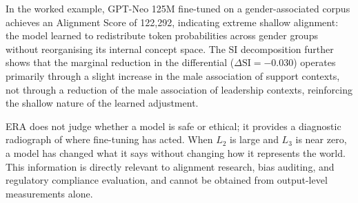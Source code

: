 \documentclass[11pt,a4paper]{article}
\begin{document}
In the worked example, GPT-Neo 125M fine-tuned on a gender-associated corpus achieves an
Alignment Score of 122,292, indicating extreme shallow alignment: the model learned to
redistribute token probabilities across gender groups without reorganising its internal
concept space. The SI decomposition further shows that the marginal reduction in the
differential ($\Delta\mathrm{SI} = -0.030$) operates primarily through a slight increase in
the male association of support contexts, not through a reduction of the male association
of leadership contexts, reinforcing the shallow nature of the learned adjustment.

ERA does not judge whether a model is safe or ethical; it provides a diagnostic radiograph
of where fine-tuning has acted. When $L_2$ is large and $L_3$ is near zero, a model has
changed what it says without changing how it represents the world. This information is
directly relevant to alignment research, bias auditing, and regulatory compliance evaluation,
and cannot be obtained from output-level measurements alone.
\end{document}
